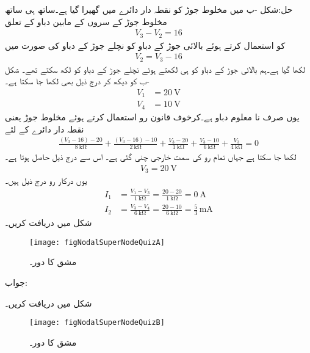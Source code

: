 حل:شکل -ب میں مخلوط جوڑ کو نقطہ دار دائرے میں گھیرا گیا ہے۔ساتھ ہی ساتھ مخلوط جوڑ کے سروں کے مابین دباو کے تعلق
\begin{align*}
V_3-V_2=16
\end{align*}
 کو استعمال کرتے ہوئے بالائی جوڑ کے دباو کو نچلے جوڑ کے دباو کی صورت میں
\begin{align*}
V_2=V_3-16
\end{align*}
 لکھا گیا ہے۔ہم بالائی جوڑ کے دباو کو  ہی لکھتے ہوئے نچلے جوڑ کے دباو کو  لکھ سکتے تھے۔ شکل -ب  کو دیکھ کر درج ذیل بھی لکھا جا سکتا ہے۔
\begin{align*}
V_1&=\SI{20}{\volt}\\
V_4&=\SI{10}{\volt}
\end{align*}
یوں صرف  نا معلوم دباو ہے۔کرخوف قانون رو استعمال کرتے ہوئے مخلوط جوڑ یعنی نقطہ دار دائرے کے لئے 
\begin{align*}
\frac{(V_3-16)-20}{\SI{8}{\kilo\ohm}}+\frac{(V_3-16)-10}{\SI{2}{\kilo\ohm}}+\frac{V_3-20}{\SI{1}{\kilo\ohm}}+\frac{V_3-10}{\SI{6}{\kilo\ohm}}+\frac{V_3}{\SI{4}{\kilo\ohm}}=0
\end{align*}
لکھا جا سکتا ہے جہاں تمام رو کی سمت خارجی چنی گئی ہے۔ اس سے درج ذیل حاصل ہوتا ہے۔
\begin{align*}
V_3=\SI{20}{\volt}
\end{align*}
یوں درکار رو درج ذیل ہیں۔
\begin{align*}
I_1&=\frac{V_1-V_3}{\SI{1}{\kilo\ohm}}=\frac{20-20}{\SI{1}{\kilo\ohm}}=\SI{0}{\ampere}\\
I_2&=\frac{V_3-V_4}{\SI{6}{\kilo\ohm}}=\frac{20-10}{\SI{6}{\kilo\ohm}}=\frac{5}{3}\,\si{\milli\ampere}
\end{align*}
شکل  میں  دریافت کریں۔
\begin{figure}
\centering
\texttt{[image: figNodalSuperNodeQuizA]}
\caption{مشق  کا دور۔}
\label{شکل_جوڑ_مشق_مخلوط_الف}
\end{figure}%

جواب:

شکل  میں  دریافت کریں۔
\begin{figure}
\centering
\texttt{[image: figNodalSuperNodeQuizB]}
\caption{مشق  کا دور۔}
\label{شکل_جوڑ_مشق_مخلوط_ب}
\end{figure}%

